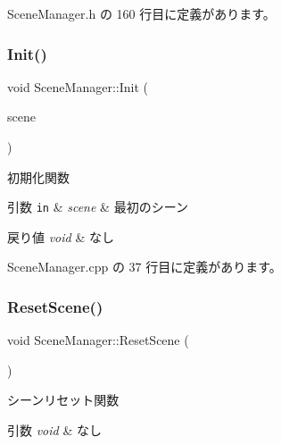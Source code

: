  Scene\+Manager.\+h の 160 行目に定義があります。

\mbox{\label{class_scene_manager_a3d14c04a921c6c670e89fbf22a719b00}} 
\subsubsection{\texorpdfstring{Init()}{Init()}}
{\footnotesize\ttfamily void Scene\+Manager\+::\+Init (\begin{DoxyParamCaption}\item[{\mbox{\hyperlink{class_scene_base}{Scene\+Base}} $\ast$}]{scene }\end{DoxyParamCaption})}



初期化関数 


\begin{DoxyParams}[1]{引数}
\mbox{\tt in}  & {\em scene} & 最初のシーン \\
\hline
\end{DoxyParams}

\begin{DoxyRetVals}{戻り値}
{\em void} & なし \\
\hline
\end{DoxyRetVals}


 Scene\+Manager.\+cpp の 37 行目に定義があります。

\mbox{\label{class_scene_manager_a1759161a38025ec8212dc98439fd7335}} 
\subsubsection{\texorpdfstring{Reset\+Scene()}{ResetScene()}}
{\footnotesize\ttfamily void Scene\+Manager\+::\+Reset\+Scene (\begin{DoxyParamCaption}{ }\end{DoxyParamCaption})}



シーンリセット関数 


\begin{DoxyParams}{引数}
{\em void} & なし \\
\hline
\end{DoxyParams}

